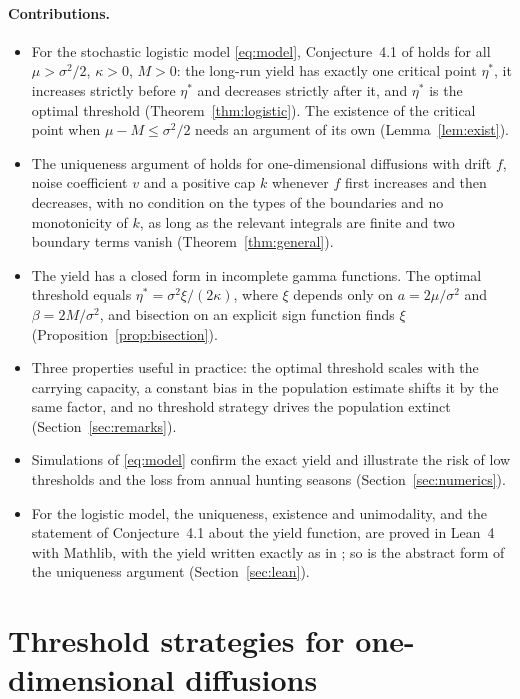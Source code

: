 \documentclass[11pt]{article}
\theoremstyle{definition}
\begin{document}
\paragraph{Contributions.}
\begin{itemize}
\item For the stochastic logistic model \eqref{eq:model}, Conjecture~4.1 of \cite{hening19} holds for all
$\mu > \sigma^2/2$, $\kappa > 0$, $M > 0$: the long-run yield has exactly one critical point $\eta^*$, it
increases strictly before $\eta^*$ and decreases strictly after it, and $\eta^*$ is the optimal threshold
(Theorem~\ref{thm:logistic}). The existence of the critical point when $\mu - M \le \sigma^2/2$ needs an
argument of its own (Lemma~\ref{lem:exist}).
\item The uniqueness argument of \cite{ekstrom26} holds for one-dimensional diffusions with drift $f$, noise
coefficient $v$ and a positive cap $k$ whenever $f$ first increases and then decreases, with no condition on the
types of the boundaries and no monotonicity of $k$, as long as the relevant integrals are finite and two boundary
terms vanish (Theorem~\ref{thm:general}).
\item The yield has a closed form in incomplete gamma functions. The optimal threshold equals
$\eta^* = \sigma^2\xi/(2\kappa)$, where $\xi$ depends only on $a = 2\mu/\sigma^2$ and $\beta = 2M/\sigma^2$, and
bisection on an explicit sign function finds $\xi$ (Proposition~\ref{prop:bisection}).
\item Three properties useful in practice: the optimal threshold scales with the carrying capacity, a constant
bias in the population estimate shifts it by the same factor, and no threshold strategy drives the population
extinct (Section~\ref{sec:remarks}).
\item Simulations of \eqref{eq:model} confirm the exact yield and illustrate the risk of low thresholds and the
loss from annual hunting seasons (Section~\ref{sec:numerics}).
\item For the logistic model, the uniqueness, existence and unimodality, and the statement of Conjecture~4.1
about the yield function, are proved in Lean~4 with Mathlib, with the yield written exactly as in
\cite[eq.~(4.4)]{hening19}; so is the abstract form of the uniqueness argument (Section~\ref{sec:lean}).
\end{itemize}

\section{Threshold strategies for one-dimensional diffusions}\label{sec:general}
\end{document}

